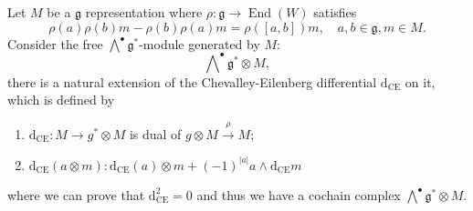 \documentclass[10pt]{article}
\begin{document}
Let $ M$ be a $ \mathfrak{g}$ representation where $ \rho : \mathfrak{g} \rightarrow \operatorname{End}(W)$ satisfies
\begin{equation*}
  \rho(a) \rho(b) m - \rho(b) \rho(a) m = \rho([a,b]) m, \quad a,b \in \mathfrak{g}, m \in M.
\end{equation*}
Consider the free $\bigwedge^{\bullet} \mathfrak{g}^{*}$-module generated by $ M$:
\begin{equation*}
  \bigwedge\nolimits^{\bullet} \mathfrak{g}^{*} \otimes M,
\end{equation*}
there is a natural extension of the Chevalley-Eilenberg differential $ \mathrm{d} _{\mathrm{CE}}$ on it, which is defined by
\begin{enumerate}[(1)]
  \item $ \mathrm{d} _{\mathrm{CE}} : M \rightarrow g^{*}\otimes M$ is dual of $ g \otimes M \xrightarrow{\rho} M$;
  \item $ \mathrm{d} _{\mathrm{CE}}(a\otimes m) : \mathrm{d} _{\mathrm{CE}}(a) \otimes m + (-1)^{|a|} a \wedge \mathrm{d} _{\mathrm{CE}} m$
\end{enumerate}
where we can prove that $ \mathrm{d} _{\mathrm{CE}}^{2} = 0$ and thus we have a cochain complex $\bigwedge^{\bullet} \mathfrak{g}^{*} \otimes M$.
\end{document}
